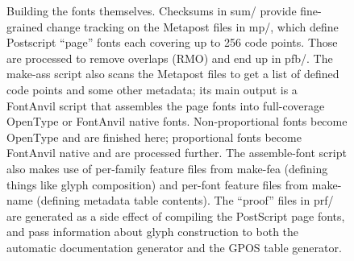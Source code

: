 \documentclass[14pt]{extarticle}
\begin{document}
\begin{figure}
\caption{Building the fonts themselves.  Checksums in sum/ provide
fine-grained change tracking on the Metapost files in mp/, which define
Postscript ``page'' fonts each covering up to 256 code points.  Those are
processed to remove overlaps (RMO) and end up in pfb/.  The make-ass script
also scans the Metapost files to get a list of defined code points and some
other metadata; its main output is a FontAnvil
script that assembles the page fonts into full-coverage OpenType or
FontAnvil native fonts.  Non-proportional fonts become OpenType and are
finished here; proportional fonts become FontAnvil native and are processed
further.  The assemble-font script also makes use of per-family feature
files from make-fea (defining things like glyph composition) and per-font
feature files from make-name (defining metadata table contents).  The
``proof'' files in prf/ are generated as a side effect of compiling the
PostScript page fonts, and pass information about glyph construction to
both the automatic documentation generator and the GPOS table generator.}
\label{fig:build-fonts}
\end{figure}
\end{document}
